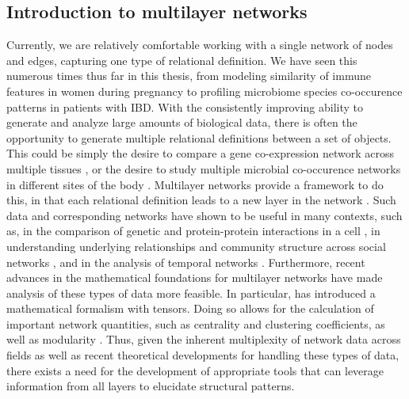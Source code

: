 \subsection{Introduction to multilayer networks}
Currently, we are relatively comfortable working with a single network of nodes and edges, capturing one type of relational definition. We have seen this numerous times thus far in this thesis, from modeling similarity of immune features in women during pregnancy to profiling microbiome species co-occurence patterns in patients with IBD. With the consistently improving ability to generate and analyze large amounts of biological data, there is often the opportunity to generate multiple relational definitions between a set of objects. This could be simply the desire to compare a gene co-expression network across multiple tissues \cite{ohmNet}, or the desire to study multiple microbial co-occurence networks in different sites of the body \cite{microbiome}. Multilayer networks provide a framework to do this, in that each relational definition leads to a new layer in the network \cite{kivelamultilayer,boccaletti2014structure,manlioMathFoundations}.  Such data and corresponding networks have shown to be useful in many contexts, such as, in the comparison of genetic and protein-protein interactions in a cell \cite{genetic}, in understanding underlying relationships and community structure across social networks \cite{socialnetwork}, and in the analysis of temporal networks \cite{muchamultislice}. Furthermore, recent advances in the mathematical foundations for multilayer networks have made analysis of these types of data more feasible. In particular, \cite{manlioMathFoundations} has introduced a mathematical formalism with tensors. Doing so allows for the calculation of important network quantities, such as centrality and clustering coefficients, as well as modularity \cite{muchamultislice}. Thus, given the inherent multiplexity of network data across fields as well as recent theoretical developments for handling these types of data, there exists a need for the development of appropriate tools that can leverage information from all layers to elucidate structural patterns.

